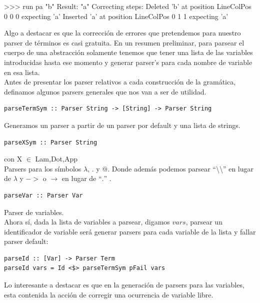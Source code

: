 \documentclass[a4paper,10pt]{article}
\newenvironment{code}{\footnotesize\verbatim}{\endverbatim\normalsize}
\begin{document}
\begin{code}
 >>> run pa  "b"
     Result: "a"
     Correcting steps: 
       Deleted   'b' at position LineColPos 0 0 0 expecting 'a'
       Inserted  'a' at position LineColPos 0 1 1 expecting 'a'
\end{code}

Algo a destacar es que la corrección de errores que pretendemos para nuestro
parser de términos es casi gratuita. En un resumen preliminar, para parsear el
cuerpo de una abstracción solamente tenemos que tener una lista de las variables
introducidas hasta ese momento y generar parser's para cada nombre de variable
en esa lista.\\

Antes de presentar los parser relativos a cada construcción de la gramática,
definamos algunos parsers generales que nos van a ser de utilidad.

\begin{lstlisting}
parseTermSym :: Parser String -> [String] -> Parser String
\end{lstlisting}
Generamos un parser a partir de un parser por default y una lista de strings.

\begin{lstlisting}
parseXSym :: Parser String
\end{lstlisting} con X $\in$ {Lam,Dot,App}\\

Parsers para los símbolos $\lambda$, $.$ y $@$. Donde además podemos parsear 
``\textbackslash \textbackslash'' en lugar de $\lambda$ y $->$ o $\rightarrow$
en lugar de ``$.$'' .

\begin{lstlisting}
parseVar :: Parser Var
\end{lstlisting} Parser de variables.\\

Ahora sí, dada la lista de variables a parsear, digamos $vars$, parsear un
identificador de variable será generar parsers para cada variable de la lista
y fallar parser default:

\begin{lstlisting}
parseId :: [Var] -> Parser Term
parseId vars = Id <$> parseTermSym pFail vars
\end{lstlisting}

Lo interesante a destacar es que en la generación de parsers para las variables,
esta contenida la acción de corregir una ocurrencia de variable libre.\\
\end{document}
